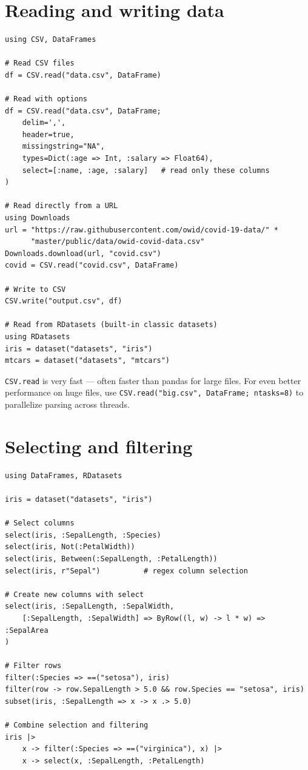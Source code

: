 \section{Reading and writing data}

\begin{verbatim}
using CSV, DataFrames

# Read CSV files
df = CSV.read("data.csv", DataFrame)

# Read with options
df = CSV.read("data.csv", DataFrame;
    delim=',',
    header=true,
    missingstring="NA",
    types=Dict(:age => Int, :salary => Float64),
    select=[:name, :age, :salary]   # read only these columns
)

# Read directly from a URL
using Downloads
url = "https://raw.githubusercontent.com/owid/covid-19-data/" *
      "master/public/data/owid-covid-data.csv"
Downloads.download(url, "covid.csv")
covid = CSV.read("covid.csv", DataFrame)

# Write to CSV
CSV.write("output.csv", df)

# Read from RDatasets (built-in classic datasets)
using RDatasets
iris = dataset("datasets", "iris")
mtcars = dataset("datasets", "mtcars")
\end{verbatim}

\begin{juliatip}
\texttt{CSV.read} is very fast --- often faster than pandas for large files. For even better performance on huge files, use \texttt{CSV.read("big.csv", DataFrame; ntasks=8)} to parallelize parsing across threads.
\end{juliatip}

\section{Selecting and filtering}

\begin{verbatim}
using DataFrames, RDatasets

iris = dataset("datasets", "iris")

# Select columns
select(iris, :SepalLength, :Species)
select(iris, Not(:PetalWidth))
select(iris, Between(:SepalLength, :PetalLength))
select(iris, r"Sepal")          # regex column selection

# Create new columns with select
select(iris, :SepalLength, :SepalWidth,
    [:SepalLength, :SepalWidth] => ByRow((l, w) -> l * w) => :SepalArea
)

# Filter rows
filter(:Species => ==("setosa"), iris)
filter(row -> row.SepalLength > 5.0 && row.Species == "setosa", iris)
subset(iris, :SepalLength => x -> x .> 5.0)

# Combine selection and filtering
iris |>
    x -> filter(:Species => ==("virginica"), x) |>
    x -> select(x, :SepalLength, :PetalLength)
\end{verbatim}

